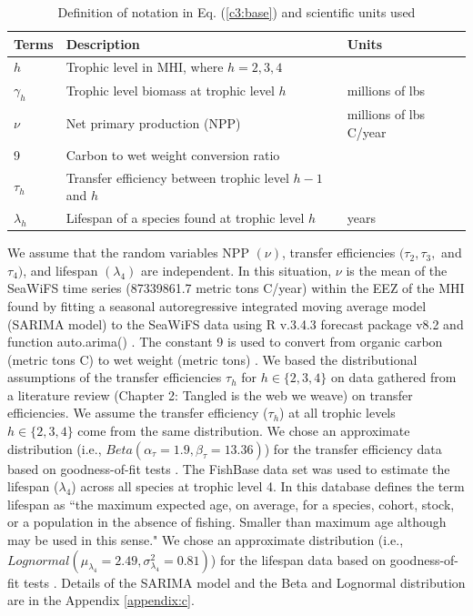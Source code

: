 \documentclass[oneside,12pt,final]{sty/ucthesis-CA2012}
\let\cite\citep                             %
\begin{document}
\begin{mainmatter}
\begin{table}[H]
\centering
\caption{Definition of notation in Eq. (\ref{c3:base}) and scientific units used}
\begin{tabular}{l|l|l}
  \hline \small
 Terms & Description & Units  \\ 
   \hline
   $h$ & Trophic level in MHI, where $h = 2,3,4$  & \\
   $\gamma_h$ &  Trophic level biomass at trophic level $h$ & millions of lbs  \\
   $\nu$ & Net primary production (NPP)  & millions of lbs C/year \\
   9 & Carbon to wet weight conversion ratio & \\
   $\tau_{h}$ & Transfer efficiency between trophic level $h-1$ and $h$ &   \\  
   $\lambda_h$ & Lifespan of a species found at trophic level $h$ & years \\
   \hline
\end{tabular} 
\label{c3:description}
\end{table}

We assume that the random variables NPP $(\nu)$, transfer efficiencies $(\tau_2, \tau_3,$ and $\tau_4)$, and lifespan $(\lambda_4)$ are independent. In this situation, $\nu$ is the mean of the SeaWiFS time series (87339861.7 metric tons C/year) within the EEZ of the MHI found by fitting a seasonal autoregressive integrated moving average model (SARIMA model) to the SeaWiFS data using R v.3.4.3 \cite{Rcite} forecast package v8.2 and function auto.arima() \cite{forecast1, forecast2}. The constant 9 is used to convert from organic carbon (metric tons C) to wet weight (metric tons) \cite{strathmann1967estimating, pauly1995primary, chassot2010global}. We based the distributional assumptions of the transfer efficiencies $\tau_h$ for $h \in \{2, 3, 4\}$ on data gathered from a literature review (Chapter 2: Tangled is the web we weave) on transfer efficiencies. We assume the transfer efficiency ($\tau_h$) at all trophic levels $h \in \{2, 3, 4\}$ come from the same distribution. We chose an approximate distribution (i.e., $Beta(\alpha_\tau=1.9, \beta_{\tau}=13.36)$) for the transfer efficiency data based on goodness-of-fit tests \cite{fitdistrplus}. The \citet{fishbase} FishBase data set was used to estimate the lifespan ($\lambda_4$) across all species at trophic level 4. In this database \citet{fishbase} defines the term lifespan as ``the maximum expected age, on average, for a species, cohort, stock, or a population in the absence of fishing. Smaller than maximum age although may be used in this sense." We chose an approximate distribution (i.e., $Lognormal(\mu_{\lambda_4}=2.49, \sigma^2_{\lambda_4}=0.81)$) for the lifespan data based on goodness-of-fit tests \cite{fitdistrplus}. Details of the SARIMA model and the Beta and Lognormal distribution are in the Appendix \ref{appendix:c}. 


\end{mainmatter}
\end{document}
